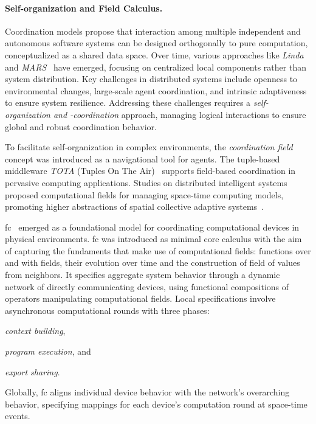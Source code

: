 \documentclass[12pt, a4paper]{article}
\newenvironment{inlinelist}{\begin{enumerate*}[label=\emph{(\roman*)}]}{\end{enumerate*}}
\begin{document}
\sloppypar
\paragraph{Self-organization and Field Calculus.}

Coordination models propose that interaction among multiple independent and autonomous software systems can be designed
orthogonally to pure computation, conceptualized as a shared data space.
%
Over time,
various approaches like \textit{Linda}~\cite{ViroliCoordination2012} and \textit{MARS}~\cite{mars} have emerged,
focusing on centralized local components rather than system distribution.
%
Key challenges in distributed systems include openness to environmental changes, large-scale agent coordination,
and intrinsic adaptiveness to ensure system resilience.
%
Addressing these challenges requires a \emph{self-organization and -coordination} approach,
managing logical interactions to
ensure global and robust coordination behavior.

To facilitate self-organization in complex environments, the \emph{coordination field} concept was introduced as a
navigational tool for agents.
%
The tuple-based middleware \textit{TOTA} (Tuples On The Air)~\cite{tota} supports field-based coordination in pervasive
computing applications.
%
Studies on distributed intelligent systems proposed computational fields for managing space-time
computing models, promoting higher abstractions of spatial collective adaptive systems~\cite{JLAMP2019}.

\ac{fc}~\cite{TOCL2019} emerged as a foundational model for coordinating computational devices in physical environments.
%
\ac{fc} was introduced as minimal core calculus with the aim of capturing the fundaments that make use of computational fields:
functions over and with fields, their evolution over time and the construction of field of values from neighbors.
%
It specifies aggregate system behavior through a dynamic network of directly communicating devices,
using functional compositions of operators manipulating computational fields.
%
Local specifications involve asynchronous computational rounds with three phases:
\begin{inlinelist}
    \item \emph{context building},
    \item \emph{program execution}, and
    \item \emph{export sharing}.
\end{inlinelist}
%
Globally,
\ac{fc} aligns individual device behavior with the network's overarching behavior,
specifying mappings for each device's computation round at space-time events.
\end{document}
